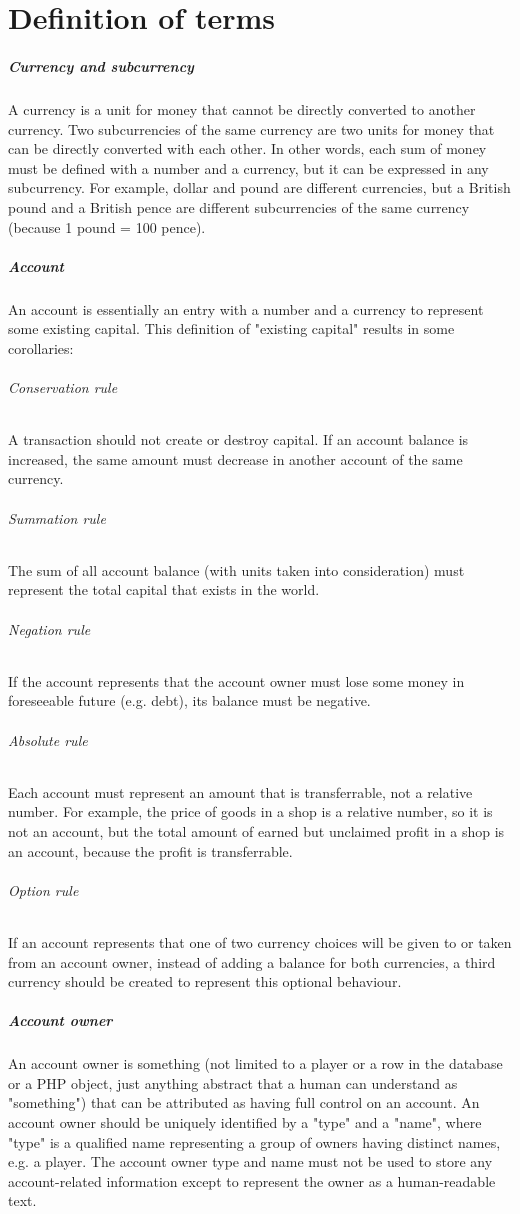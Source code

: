 \documentclass{report}
\begin{document}
		\chapter{Definition of terms}

			\paragraph{Currency and subcurrency}
				A currency is a unit for money that cannot be directly converted to another currency.
				Two subcurrencies of the same currency are two units for money that can be directly converted with each other.
				In other words, each sum of money must be defined with a number and a currency, but it can be expressed in any subcurrency.
				For example, dollar and pound are different currencies, but a British pound and a British pence are different subcurrencies of the same currency
				(because 1 pound = 100 pence).

			\paragraph{Account}
				An account is essentially an entry with a number and a currency to represent some existing capital.
				This definition of "existing capital" results in some corollaries:
				\subparagraph{Conservation rule} A transaction should not create or destroy capital.
					If an account balance is increased, the same amount must decrease in another account of the same currency.
				\subparagraph{Summation rule} The sum of all account balance (with units taken into consideration) must represent the total capital that exists in the world.
				\subparagraph{Negation rule} If the account represents that the account owner must lose some money in foreseeable future (e.g. debt), its balance must be negative.
				\subparagraph{Absolute rule} Each account must represent an amount that is transferrable, not a relative number.
					For example, the price of goods in a shop is a relative number, so it is not an account,
					but the total amount of earned but unclaimed profit in a shop is an account, because the profit is transferrable.
				\subparagraph{Option rule} If an account represents that one of two currency choices will be given to or taken from an account owner,
					instead of adding a balance for both currencies, a third currency should be created to represent this optional behaviour.

			\paragraph{Account owner}
				An account owner is something (not limited to a player or a row in the database or a PHP object,
				just anything abstract that a human can understand as "something") that can be attributed as having full control on an account.
				An account owner should be uniquely identified by a "type" and a "name",
				where "type" is a qualified name representing a group of owners having distinct names, e.g. a player.
				The account owner type and name must not be used to store any account-related information except to represent the owner as a human-readable text.
\end{document}
